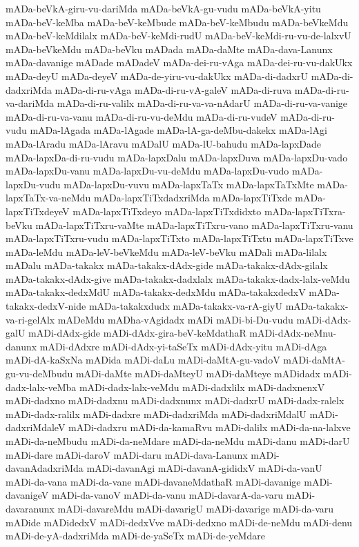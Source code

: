 {mADa-beVkA-giru-vu-dariMda
mADa-beVkA-gu-vudu
mADa-beVkA-yitu
mADa-beV-keMba
mADa-beV-keMbude
mADa-beV-keMbudu
mADa-beVkeMdu
mADa-beV-keMdilalx
mADa-beV-keMdi-rudU
mADa-beV-keMdi-ru-vu-de-lalxvU
mADa-beVkeMdu
mADa-beVku
mADada
mADa-daMte
mADa-dava-Lanunx
mADa-davanige
mADade
mADadeV
mADa-dei-ru-vAga
mADa-dei-ru-vu-dakUkx
mADa-deyU
mADa-deyeV
mADa-de-yiru-vu-dakUkx
mADa-di-dadxrU
mADa-di-dadxriMda
mADa-di-ru-vAga
mADa-di-ru-vA-galeV
mADa-di-ruva
mADa-di-ru-va-dariMda
mADa-di-ru-valilx
mADa-di-ru-va-va-nAdarU
mADa-di-ru-va-vanige
mADa-di-ru-va-vanu
mADa-di-ru-vu-deMdu
mADa-di-ru-vudeV
mADa-di-ru-vudu
mADa-lAgada
mADa-lAgade
mADa-lA-ga-deMbu-dakekx
mADa-lAgi
mADa-lAradu
mADa-lAravu
mADalU
mADa-lU-bahudu
mADa-lapxDade
mADa-lapxDa-di-ru-vudu
mADa-lapxDalu
mADa-lapxDuva
mADa-lapxDu-vado
mADa-lapxDu-vanu
mADa-lapxDu-vu-deMdu
mADa-lapxDu-vudo
mADa-lapxDu-vudu
mADa-lapxDu-vuvu
mADa-lapxTaTx
mADa-lapxTaTxMte
mADa-lapxTaTx-va-neMdu
mADa-lapxTiTxdadxriMda
mADa-lapxTiTxde
mADa-lapxTiTxdeyeV
mADa-lapxTiTxdeyo
mADa-lapxTiTxdidxto
mADa-lapxTiTxra-beVku
mADa-lapxTiTxru-vaMte
mADa-lapxTiTxru-vano
mADa-lapxTiTxru-vanu
mADa-lapxTiTxru-vudu
mADa-lapxTiTxto
mADa-lapxTiTxtu
mADa-lapxTiTxve
mADa-leMdu
mADa-leV-beVkeMdu
mADa-leV-beVku
mADali
mADa-lilalx
mADalu
mADa-takakx
mADa-takakx-dAdx-gide
mADa-takakx-dAdx-gilalx
mADa-takakx-dAdx-give
mADa-takakx-dadxlalx
mADa-takakx-dadx-lalx-veMdu
mADa-takakx-dedxMdU
mADa-takakx-dedxMdu
mADa-takakxdedxV
mADa-takakx-dedxV-nide
mADa-takakxdudx
mADa-takakx-va-rA-giyU
mADa-takakx-va-ri-gelAlx
mADeMdu
mADha-vAgidadx
mADi
mADi-bi-Du-vudu
mADi-dAdx-galU
mADi-dAdx-gide
mADi-dAdx-gira-beV-keMdathaR
mADi-dAdx-neMnu-danunx
mADi-dAdxre
mADi-dAdx-yi-taSeTx
mADi-dAdx-yitu
mADi-dAga
mADi-dA-kaSxNa
mADida
mADi-daLu
mADi-daMtA-gu-vadoV
mADi-daMtA-gu-vu-deMbudu
mADi-daMte
mADi-daMteyU
mADi-daMteye
mADidadx
mADi-dadx-lalx-veMba
mADi-dadx-lalx-veMdu
mADi-dadxlilx
mADi-dadxnenxV
mADi-dadxno
mADi-dadxnu
mADi-dadxnunx
mADi-dadxrU
mADi-dadx-ralelx
mADi-dadx-ralilx
mADi-dadxre
mADi-dadxriMda
mADi-dadxriMdalU
mADi-dadxriMdaleV
mADi-dadxru
mADi-da-kamaRvu
mADi-dalilx
mADi-da-na-lalxve
mADi-da-neMbudu
mADi-da-neMdare
mADi-da-neMdu
mADi-danu
mADi-darU
mADi-dare
mADi-daroV
mADi-daru
mADi-dava-Lanunx
mADi-davanAdadxriMda
mADi-davanAgi
mADi-davanA-gididxV
mADi-da-vanU
mADi-da-vana
mADi-da-vane
mADi-davaneMdathaR
mADi-davanige
mADi-davanigeV
mADi-da-vanoV
mADi-da-vanu
mADi-davarA-da-varu
mADi-davaranunx
mADi-davareMdu
mADi-davarigU
mADi-davarige
mADi-da-varu
mADide
mADidedxV
mADi-dedxVve
mADi-dedxno
mADi-de-neMdu
mADi-denu
mADi-de-yA-dadxriMda
mADi-de-yaSeTx
mADi-de-yeMdare
}

